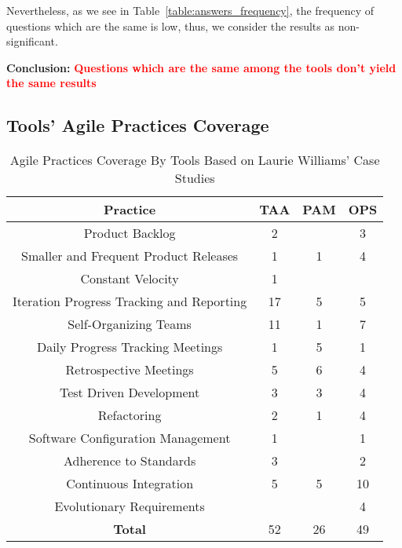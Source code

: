 Nevertheless, as we see in Table~\ref{table:answers_frequency}, the frequency of questions which are the same is low, thus, we consider the results as non-significant.

\textbf{Conclusion:} \textcolor{red}{\textbf{Questions which are the same among the tools don't yield the same results}}

\clearpage

\subsection*{Tools' Agile Practices Coverage}

\begin{table} [H]
\centering
	\scriptsize
	\begin{tabular}{| c | c | c | c |} \hline
		\textbf{Practice} & \textbf{TAA} & \textbf{PAM} & \textbf{OPS} \\ \hline
		Product Backlog & 2 & & 3 \\ \hline
		Smaller and Frequent Product Releases & 1 & 1 & 4 \\ \hline
		Constant Velocity & 1 & & \\ \hline
		Iteration Progress Tracking and Reporting & 17 & 5 & 5 \\ \hline
		Self-Organizing Teams & 11 & 1 & 7 \\ \hline
		Daily Progress Tracking Meetings & 1 & 5 & 1 \\ \hline
		Retrospective Meetings & 5 & 6 & 4 \\ \hline
		Test Driven Development & 3 & 3 & 4 \\ \hline
		Refactoring & 2 & 1 & 4 \\ \hline
		Software Configuration Management & 1 & & 1 \\ \hline
		Adherence to Standards & 3 & & 2 \\ \hline
		Continuous Integration & 5 & 5 & 10 \\ \hline	
		Evolutionary Requirements & & & 4 \\ \hline
		\textbf{Total} & 52 & 26 & 49 \\ \hline
	\end{tabular}
	\caption{{\footnotesize Agile Practices Coverage By Tools Based on Laurie Williams' Case Studies}}
\end{table}

\clearpage

